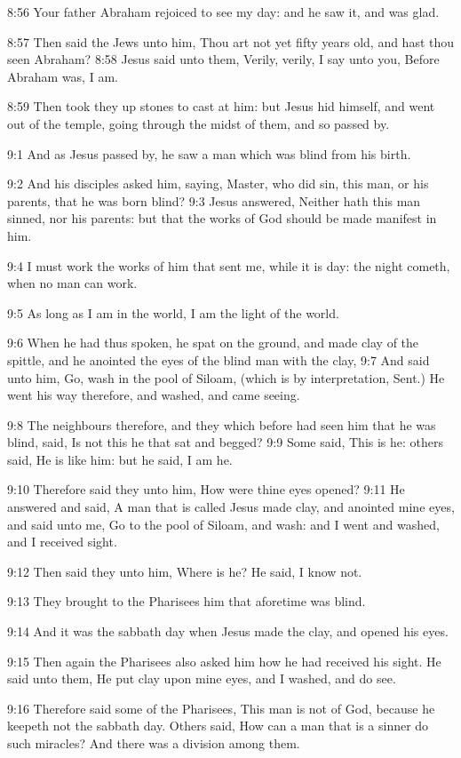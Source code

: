 8:56 Your father Abraham rejoiced to see my day: and he saw it, and
was glad.

8:57 Then said the Jews unto him, Thou art not yet fifty years old,
and hast thou seen Abraham?  8:58 Jesus said unto them, Verily,
verily, I say unto you, Before Abraham was, I am.

8:59 Then took they up stones to cast at him: but Jesus hid himself,
and went out of the temple, going through the midst of them, and so
passed by.

9:1 And as Jesus passed by, he saw a man which was blind from his
birth.

9:2 And his disciples asked him, saying, Master, who did sin, this
man, or his parents, that he was born blind?  9:3 Jesus answered,
Neither hath this man sinned, nor his parents: but that the works of
God should be made manifest in him.

9:4 I must work the works of him that sent me, while it is day: the
night cometh, when no man can work.

9:5 As long as I am in the world, I am the light of the world.

9:6 When he had thus spoken, he spat on the ground, and made clay of
the spittle, and he anointed the eyes of the blind man with the clay,
9:7 And said unto him, Go, wash in the pool of Siloam, (which is by
interpretation, Sent.) He went his way therefore, and washed, and came
seeing.

9:8 The neighbours therefore, and they which before had seen him that
he was blind, said, Is not this he that sat and begged?  9:9 Some
said, This is he: others said, He is like him: but he said, I am he.

9:10 Therefore said they unto him, How were thine eyes opened?  9:11
He answered and said, A man that is called Jesus made clay, and
anointed mine eyes, and said unto me, Go to the pool of Siloam, and
wash: and I went and washed, and I received sight.

9:12 Then said they unto him, Where is he? He said, I know not.

9:13 They brought to the Pharisees him that aforetime was blind.

9:14 And it was the sabbath day when Jesus made the clay, and opened
his eyes.

9:15 Then again the Pharisees also asked him how he had received his
sight. He said unto them, He put clay upon mine eyes, and I washed,
and do see.

9:16 Therefore said some of the Pharisees, This man is not of God,
because he keepeth not the sabbath day. Others said, How can a man
that is a sinner do such miracles? And there was a division among
them.

